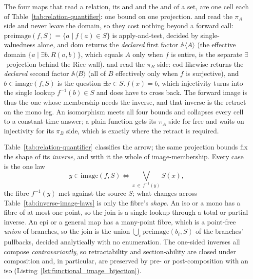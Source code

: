 \documentclass[11pt, a4paper]{article}
\begin{document}
The four maps that read a relation, its  and  and the  and  of a set, are one cell each of Table~\ref{tab:relation-quantifier}: one bound on one projection.
 and  read the $\pi_A$ side and never leave the domain, so they cost nothing beyond a forward call: $\mathrm{preimage}(f, S) = \{a \mid f(a) \in S\}$ is apply-and-test, decided by single-valuedness alone, and $\mathrm{dom}$ returns the \emph{declared} first factor $\mathbb{A}\langle A\rangle$ (the effective domain $\{a \mid \exists b.\, R(a,b)\}$, which equals $A$ only when $f$ is entire, is the separate $\exists$-projection behind the Rice wall).
 and  read the $\pi_B$ side: $\mathrm{cod}$ likewise returns the \emph{declared} second factor $\mathbb{A}\langle B\rangle$ (all of $B$ effectively only when $f$ is surjective), and $b \in \mathrm{image}(f, S)$ is the question $\exists x \in S.\, f(x) = b$, which injectivity turns into the single lookup $f^{-1}(b) \in S$ and does have to cross back.
The forward image is thus the one whose membership needs the inverse, and that inverse is the retract on the mono leg.
An isomorphism meets all four bounds and collapses every cell to a constant-time answer; a plain function gets its $\pi_A$ side for free and waits on injectivity for its $\pi_B$ side, which is exactly where the retract is required.

Table~\ref{tab:relation-quantifier} classifies the arrow; the same projection bounds fix the shape of its \emph{inverse}, and with it the whole of image-membership.
Every case is the one law
\begin{equation}
\label{eqn:image-fibre}
y \in \mathrm{image}(f, S) \iff \bigvee_{x \,\in\, f^{-1}(y)} S(x),
\end{equation}
the fibre $f^{-1}(y)$ met against the source $S$; what changes across Table~\ref{tab:inverse-image-laws} is only the fibre's \emph{shape}.
An iso or a mono has a fibre of at most one point, so the join is a single lookup through a total or partial inverse.
An epi or a general map has a many-point fibre, which is a point-free \emph{union} of branches, so the join is the union $\bigcup_i \mathrm{preimage}(b_i, S)$ of the branches' pullbacks, decided analytically with no enumeration.
The one-sided inverses all compose \emph{contravariantly}, so retractability and section-ability are closed under composition and, in particular, are preserved by pre- or post-composition with an iso (Listing~\ref{lst:functional_image_bijection}).
\end{document}

